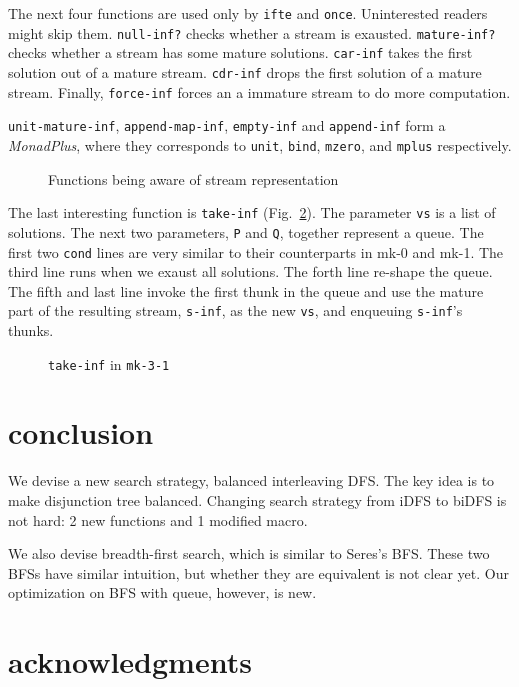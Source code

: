 \documentclass[format=acmlarge, review=true, authordraft=true]{acmart}
\begin{document}
The next four functions are used only by \texttt{ifte} and \texttt{once}. 
Uninterested readers might skip them. \texttt{null-inf?} checks whether a stream 
is exausted. \texttt{mature-inf?} checks whether a stream has some mature 
solutions. \texttt{car-inf} takes the first solution out of a mature stream. 
\texttt{cdr-inf} drops the first solution of a mature stream. Finally, 
\texttt{force-inf} forces an a immature stream to do more computation.

\texttt{unit-mature-inf}, \texttt{append-map-inf}, \texttt{empty-inf} and 
\texttt{append-inf} form a \emph{MonadPlus}, where they corresponds to 
\texttt{unit}, \texttt{bind}, \texttt{mzero}, and \texttt{mplus} respectively.

\begin{figure}
	 	
	 \caption{Functions being aware of stream representation}
	 \label{interface}
\end{figure}

The last interesting function is \texttt{take-inf} (Fig.~\ref{take-inf-3-1}). 
The parameter \texttt{vs} is a list of solutions. The next two parameters, 
\texttt{P} and \texttt{Q}, together represent a queue. The first two 
\texttt{cond} lines are very similar to their counterparts in mk-0 and mk-1. 
The third line runs when we exaust all solutions. The forth line re-shape the 
queue. The fifth and last line invoke the first thunk in the queue and use the 
mature part of the resulting stream, \texttt{s-inf}, as the new \texttt{vs}, 
and enqueuing \texttt{s-inf}'s thunks. 

\begin{figure}
	 	
	 \caption{\texttt{take-inf} in \texttt{mk-3-1}}
	 \label{take-inf-3-1}
\end{figure}



\section{conclusion}


We devise a new search strategy, balanced interleaving DFS. The key idea is to 
make disjunction tree balanced. Changing search strategy from iDFS to biDFS is 
not hard: 2 new functions and 1 modified macro. 

We also devise breadth-first search, which is similar to Seres's BFS. These two 
BFSs have similar intuition, but whether they are equivalent is not clear yet. 
Our optimization on BFS with queue, however, is new.

\section*{acknowledgments}



\end{document}
